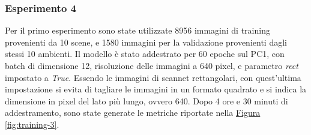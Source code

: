 \documentclass[12pt]{report}
\begin{document}
\subsubsection{Esperimento 4}
\label{sec:esperimento_4}

Per il primo esperimento sono state utilizzate 8956 immagini di training provenienti da 10 scene, e 1580 immagini per la validazione provenienti dagli stessi 10 ambienti. Il modello è stato addestrato per 60 epoche sul PC1, con batch di dimensione 12, risoluzione delle immagini a 640 pixel, e parametro \textit{rect} impostato a \textit{True}. Essendo le immagini di scannet rettangolari, con quest'ultima impostazione si evita di tagliare le immagini in un formato quadrato e si indica la dimensione in pixel del lato più lungo, ovvero 640. Dopo 4 ore e 30 minuti di addestramento, sono state generate le metriche riportate nella \hyperref[fig:training-3]{Figura \ref{fig:training-3}}.
\end{document}
